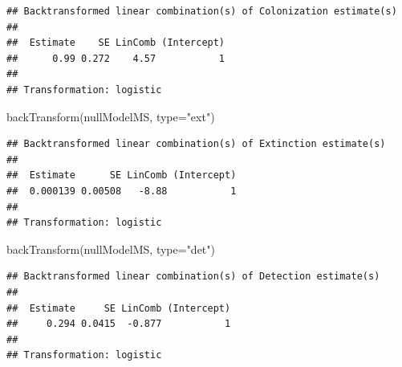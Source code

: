 \documentclass[
]{article}
\newenvironment{Shaded}{\begin{snugshade}}{\end{snugshade}}
\newcommand{\AttributeTok}[1]{\textcolor[rgb]{0.77,0.63,0.00}{#1}}
\newcommand{\FunctionTok}[1]{\textcolor[rgb]{0.00,0.00,0.00}{#1}}
\newcommand{\NormalTok}[1]{#1}
\newcommand{\StringTok}[1]{\textcolor[rgb]{0.31,0.60,0.02}{#1}}
\begin{document}
\begin{verbatim}
## Backtransformed linear combination(s) of Colonization estimate(s)
## 
##  Estimate    SE LinComb (Intercept)
##      0.99 0.272    4.57           1
## 
## Transformation: logistic
\end{verbatim}

\begin{Shaded}
\begin{Highlighting}[]
\FunctionTok{backTransform}\NormalTok{(nullModelMS, }\AttributeTok{type=}\StringTok{"ext"}\NormalTok{)}
\end{Highlighting}
\end{Shaded}

\begin{verbatim}
## Backtransformed linear combination(s) of Extinction estimate(s)
## 
##  Estimate      SE LinComb (Intercept)
##  0.000139 0.00508   -8.88           1
## 
## Transformation: logistic
\end{verbatim}

\begin{Shaded}
\begin{Highlighting}[]
\FunctionTok{backTransform}\NormalTok{(nullModelMS, }\AttributeTok{type=}\StringTok{"det"}\NormalTok{)}
\end{Highlighting}
\end{Shaded}

\begin{verbatim}
## Backtransformed linear combination(s) of Detection estimate(s)
## 
##  Estimate     SE LinComb (Intercept)
##     0.294 0.0415  -0.877           1
## 
## Transformation: logistic
\end{verbatim}
\end{document}
